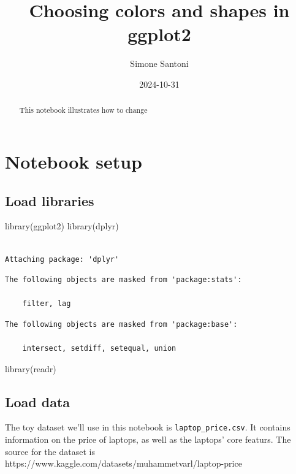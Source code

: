 \documentclass[
  letterpaper,
]{article}
\title{Choosing colors and shapes in ggplot2}
\author{Simone Santoni}
\date{2024-10-31}
\newenvironment{Shaded}{\begin{snugshade}}{\end{snugshade}}
\newcommand{\FunctionTok}[1]{\textcolor[rgb]{0.28,0.35,0.67}{#1}}
\newcommand{\NormalTok}[1]{\textcolor[rgb]{0.00,0.23,0.31}{#1}}
\begin{document}
\maketitle
\begin{abstract}
This notebook illustrates how to change
\end{abstract}


\section{Notebook setup}\label{notebook-setup}

\subsection{Load libraries}\label{load-libraries}

\begin{Shaded}
\begin{Highlighting}[]
\FunctionTok{library}\NormalTok{(ggplot2)}
\FunctionTok{library}\NormalTok{(dplyr)}
\end{Highlighting}
\end{Shaded}

\begin{verbatim}

Attaching package: 'dplyr'
\end{verbatim}

\begin{verbatim}
The following objects are masked from 'package:stats':

    filter, lag
\end{verbatim}

\begin{verbatim}
The following objects are masked from 'package:base':

    intersect, setdiff, setequal, union
\end{verbatim}

\begin{Shaded}
\begin{Highlighting}[]
\FunctionTok{library}\NormalTok{(readr)}
\end{Highlighting}
\end{Shaded}

\subsection{Load data}\label{load-data}

The toy dataset we'll use in this notebook is
\texttt{laptop\_price.csv}. It contains information on the price of
laptops, as well as the laptops' core featurs. The source for the
dataset is https://www.kaggle.com/datasets/muhammetvarl/laptop-price
\end{document}
